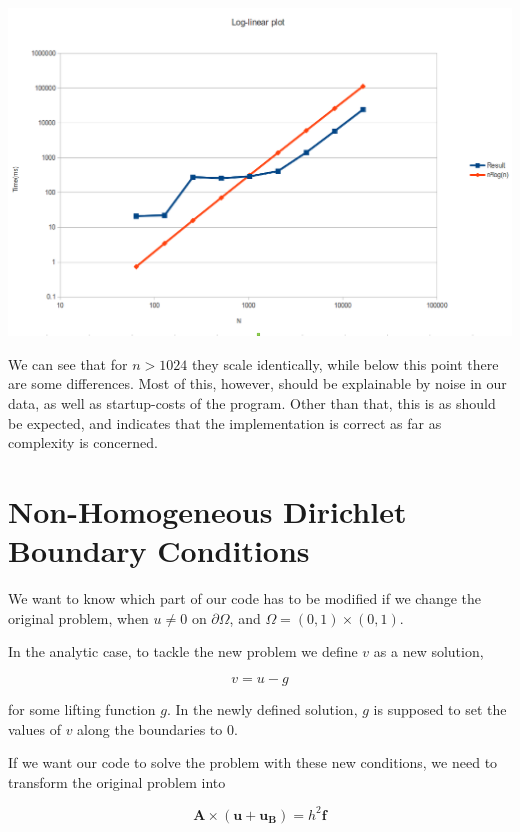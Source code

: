 \documentclass[fontsize=11pt,paper=a4,titlepage]{article}
\begin{document}
\hspace*{-1cm}\includegraphics[scale=0.55]{pics/logplot.png}

We can see that for $n > 1024$ they scale identically, while below this point
there are some differences. Most of this, however, should be explainable by
noise in our data, as well as startup-costs of the program. Other than that,
this is as should be expected, and indicates that the implementation is correct
as far as complexity is concerned.

\section{Non-Homogeneous Dirichlet Boundary Conditions}

We want to know which part of our code has to be modified if we change the
original problem, when $u \neq 0$ on $\partial\Omega$, and $\Omega = (0,1)
\times (0,1)$.

In the analytic case, to tackle the new problem we define $v$ as a new solution,

\begin{equation}
	v = u - g
\end{equation}

for some lifting function $g$. In the newly defined solution, $g$ is supposed to
set the values of $v$ along the boundaries to $0$.

If we want our code to solve the problem with these new conditions, we need to
transform the original problem into

\begin{displaymath}
	\mathbf{A} \times (\mathbf{u} + \mathbf{u_B}) = h^2 \mathbf{f}
\end{displaymath}
\end{document}

